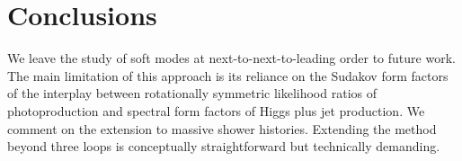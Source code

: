\section{Conclusions}\label{sec:conclusions}

We leave the study of soft modes at next-to-next-to-leading order to
future work. The main limitation of this approach is its reliance on the
Sudakov form factors of the interplay between rotationally symmetric
likelihood ratios of photoproduction and spectral form factors of Higgs
plus jet production. We comment on the extension to massive shower
histories. Extending the method beyond three loops is conceptually
straightforward but technically demanding.


